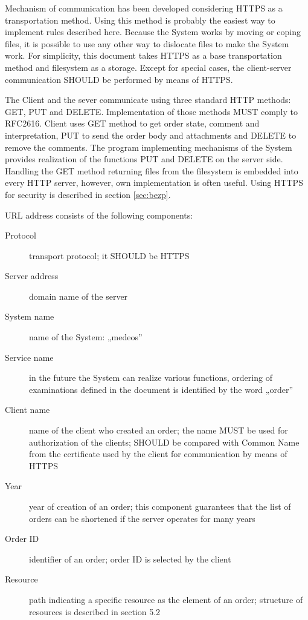 \documentclass[a4paper]{article}
\begin{document}
Mechanism of communication has been developed considering HTTPS as a transportation method.
Using this method is probably the easiest way to implement rules described here.
Because the System works by moving or coping files, it is possible to use any other way to 
dislocate files to make the System work. For simplicity, this document takes HTTPS as a base
transportation method and filesystem as a storage. Except for special cases, the client-server 
communication SHOULD be performed by means of HTTPS. 

The Client and the sever communicate using three standard HTTP methods: GET, PUT and
DELETE. Implementation of those methods MUST comply to RFC2616. Client uses GET method to
get order state, comment and interpretation, PUT to send the order body and attachments and
DELETE to remove the comments. The program implementing mechanisms of the System provides 
realization of the functions PUT and DELETE on the server side. Handling the GET method 
returning files from the filesystem is embedded into every HTTP server, however, own 
implementation is often useful. Using HTTPS for security is described in section 
\ref{sec:bezp}.

URL address consists of the following components:
\begin{description}
	\item[Protocol]	transport protocol; it SHOULD be HTTPS
	\item[Server address]	domain name of the server
	\item[System name]	name of the System: „medeos”
	\item[Service name]	in the future the System can realize various functions, ordering of 
		examinations defined in the document is identified by the word „order”
	\item[Client name]	name of the client who created an order; the name MUST be used for 
		authorization of the clients; SHOULD be compared with Common Name from the certificate 
		used by the client for communication by means of HTTPS
	\item[Year]	year of creation of an order; this component guarantees that the list of orders can be shortened if the server operates for many years
	\item[Order ID]	identifier of an order; order ID is selected by the client
	\item[Resource]	path indicating a specific resource as the element of an order; structure of resources is described in section 5.2
\end{description}
\end{document}
